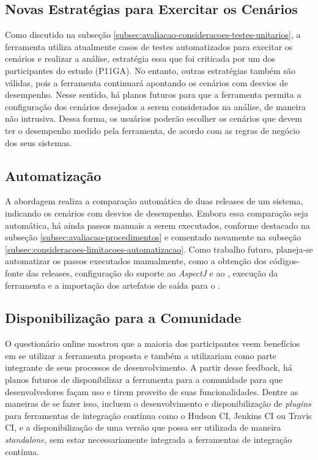 \subsection{Novas Estratégias para Exercitar os Cenários} \label{subsec:consideracoes-novas-estrategias-exercitar-cenarios}

Como discutido na subseção \ref{subsec:avaliacao-consideracoes-testes-unitarios}, a ferramenta utiliza atualmente casos de testes automatizados para execitar os cenários e realizar a análise, estratégia essa que foi criticada por um dos participantes do estudo (P11GA). No entanto, outras estratégias também são válidas, pois a ferramenta continuará apontando os cenários com desvios de desempenho. Nesse sentido, há planos futuros para que a ferramenta permita a configuração dos cenários desejados a serem considerados na análise, de maneira não intrusiva. Dessa forma, os usuários poderão escolher os cenários que devem ter o desempenho medido pela ferramenta, de acordo com as regras de negócio dos seus sistemas.

\subsection{Automatização} \label{subsec:consideracoes-automatizacao}

A abordagem realiza a comparação automática de duas releases de um sistema, indicando os cenários com desvios de desempenho. Embora essa comparação seja automática, há ainda passos manuais a serem executados, conforme destacado na subseção \ref{subsec:avaliacao-procedimentos} e comentado novamente na subseção \ref{subsec:consideracoes-limitacoes-automatizacao}. Como trabalho futuro, planeja-se automatizar os passos executados manualmente, como a obtenção dos códigos-fonte das releases, configuração do suporte ao \textit{AspectJ} e ao \textit{\perfMinerName}, execução da ferramenta e a importação dos artefatos de saída para o \textit{\toolName}.

\subsection{Disponibilização para a Comunidade}

O questionário online mostrou que a maioria dos participantes veem benefícios em se utilizar a ferramenta proposta e também a utilizariam como parte integrante de seus processos de desenvolvimento. A partir desse feedback, há planos futuros de disponibilizar a ferramenta para a comunidade para que desenvolvedores façam uso e tirem proveito de suas funcionalidades. Dentre as maneiras de se fazer isso, incluem o desenvolvimento e disponibilização de \textit{plugins} para ferramentas de integração contínua como o Hudson CI, Jenkins CI ou Travis CI, e a disponibilização de uma versão que possa ser utilizada de maneira \textit{standalone}, sem estar necessariamente integrada a ferramentas de integração contínua.

